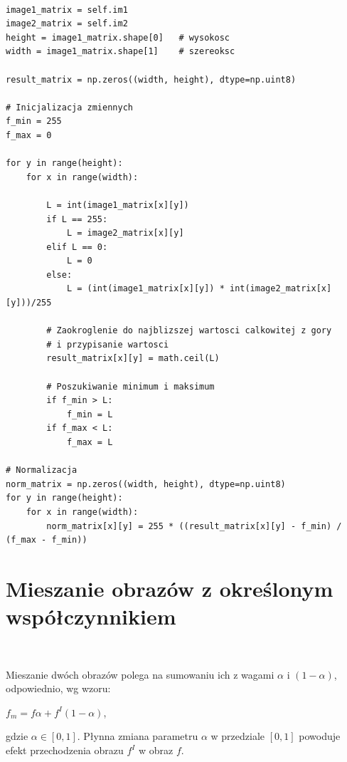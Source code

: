 \documentclass[final,a4paper,openany,12pt]{mwbk}
\begin{document}
\begin{lstlisting}[caption=Mnożenie obrazu szarego przez inny obraz ]

image1_matrix = self.im1
image2_matrix = self.im2
height = image1_matrix.shape[0]   # wysokosc
width = image1_matrix.shape[1]    # szereoksc

result_matrix = np.zeros((width, height), dtype=np.uint8)

# Inicjalizacja zmiennych
f_min = 255
f_max = 0

for y in range(height):
    for x in range(width):  

        L = int(image1_matrix[x][y]) 
        if L == 255:
            L = image2_matrix[x][y]
        elif L == 0:
            L = 0
        else:
            L = (int(image1_matrix[x][y]) * int(image2_matrix[x][y]))/255 

        # Zaokroglenie do najblizszej wartosci calkowitej z gory
        # i przypisanie wartosci
        result_matrix[x][y] = math.ceil(L)
                        
        # Poszukiwanie minimum i maksimum
        if f_min > L:
            f_min = L
        if f_max < L:
            f_max = L

# Normalizacja
norm_matrix = np.zeros((width, height), dtype=np.uint8)
for y in range(height):
    for x in range(width):
        norm_matrix[x][y] = 255 * ((result_matrix[x][y] - f_min) / (f_max - f_min))

\end{lstlisting}

\section {Mieszanie obrazów z określonym współczynnikiem}
\hfill\\
\indent
\vspace{5mm}

Mieszanie dwóch obrazów polega na sumowaniu ich z wagami $\alpha$ i $(1 - \alpha)$, odpowiednio, wg wzoru:
	
	\begin{center}
		$f_{m} = f\alpha + f^I(1 - \alpha)$,
	\end{center}
	gdzie $\alpha \in [0,1]$. Płynna zmiana parametru $\alpha$ w przedziale $[0,1]$ powoduje efekt przechodzenia obrazu $f^I$ w obraz $f$. 
	
\end{document}
